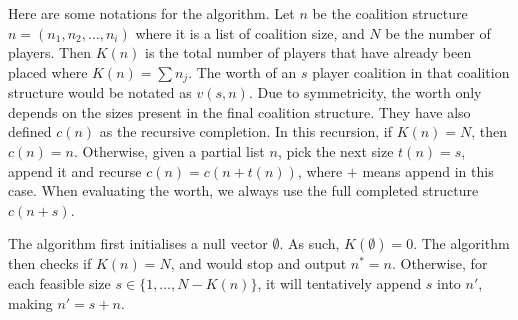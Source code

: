Here are some notations for the algorithm. Let $n$ be the coalition structure $n = (n_1, n_2, \dots, n_i)$ where it is a list of coalition size, and $N$ be the number of players. Then $K(n)$ is the total number of players that have already been placed where $K(n) = \sum n_j$. The worth of an $s$ player coalition in that coalition structure would be notated as $v(s, n)$. Due to symmetricity, the worth only depends on the sizes present in the final coalition structure. They have also defined $c(n)$ as the recursive completion. In this recursion, if $K(n) = N$, then $c(n) = n$. Otherwise, given a partial list $n$, pick the next size $t(n) = s$, append it and recurse $c(n) = c(n + t(n))$, where $+$ means append in this case. When evaluating the worth, we always use the full completed structure $c(n+s)$. 

The algorithm first initialises a null vector $\emptyset$. As such, $K(\emptyset) = 0$. The algorithm then checks if $K(n) = N$, and would stop and output $n^* = n$. Otherwise, for each feasible size $s \in \{1, \dots , N-K(n)\}$, it will tentatively append $s$ into $n'$, making $n' = s + n$. 